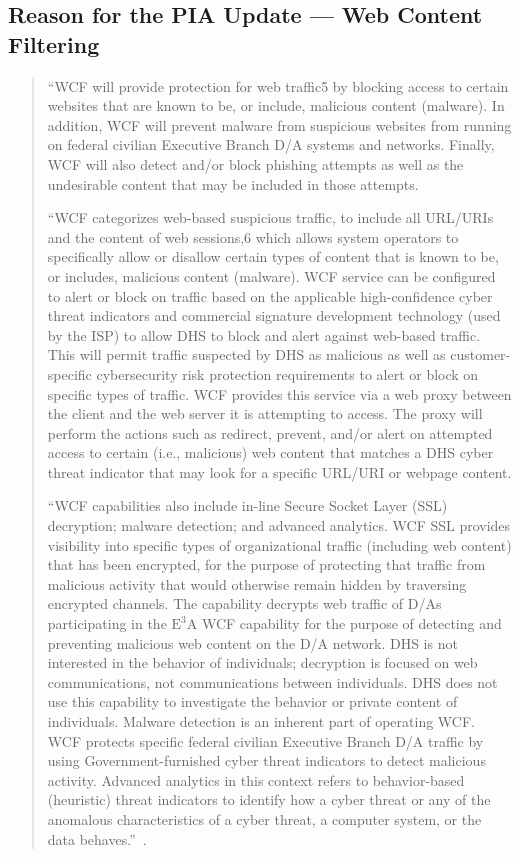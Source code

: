 \documentclass[fleqn,10pt]{wlscirep}
\newcommand{\ETA}{$\textrm{E}^\textrm{3}\textrm{A}$\xspace}
\begin{document}
\subsection{Reason for the PIA Update --- Web Content Filtering}\label{excerpt4}
\begin{quote}
``WCF will provide protection for web traffic5
by blocking
access to certain websites that are known to be, or include, malicious content (malware). In
addition, WCF will prevent malware from suspicious websites from running on federal civilian
Executive Branch D/A systems and networks. Finally, WCF will also detect and/or block phishing
attempts as well as the undesirable content that may be included in
those attempts.

``WCF categorizes web-based suspicious traffic, to include all URL/URIs and the content of web sessions,6 which allows system operators to specifically allow or disallow certain types of content that is known to be, or includes, malicious content (malware). WCF service can be configured to alert or block on traffic based on the applicable high-confidence cyber threat indicators and commercial signature development technology (used by the ISP) to allow DHS to block and alert against web-based traffic. This will permit traffic suspected by DHS as malicious as well as customer-specific cybersecurity risk protection requirements to alert or block on specific types of traffic. WCF provides this service via a web proxy between the client and the web server it is attempting to access. The proxy will perform the actions such as redirect, prevent, and/or alert on attempted access to certain (i.e., malicious) web content that matches a DHS cyber threat indicator that may look for a specific URL/URI or webpage content.

``WCF capabilities also include in-line Secure Socket Layer (SSL)
decryption; malware detection; and advanced analytics. WCF SSL
provides visibility into specific types of organizational traffic
(including web content) that has been encrypted, for the purpose of
protecting that traffic from malicious activity that would otherwise
remain hidden by traversing encrypted channels. The capability
decrypts web traffic of D/As participating in the \ETA WCF capability
for the purpose of detecting and preventing malicious web content on
the D/A network.  DHS is not interested in the behavior of
individuals; decryption is focused on web communications, not
communications between individuals. DHS does not use this capability
to investigate the behavior or private content of individuals. Malware
detection is an inherent part of operating WCF. WCF protects specific
federal civilian Executive Branch D/A traffic by using
Government-furnished cyber threat indicators to detect malicious
activity. Advanced analytics in this context refers to behavior-based
(heuristic) threat indicators to identify how a cyber threat or any of
the anomalous characteristics of a cyber threat, a computer system, or
the data behaves.''~\cite[pp 2--3]{dhs-e3a-pia2}.
\end{quote}
\end{document}
